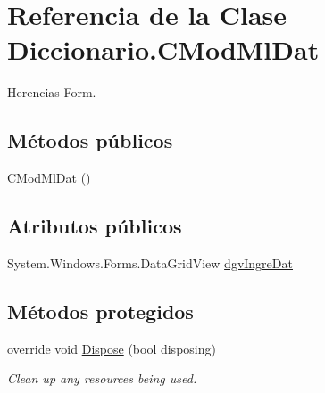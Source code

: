 \hypertarget{class_diccionario_1_1_c_mod_ml_dat}{\section{Referencia de la Clase Diccionario.\-C\-Mod\-Ml\-Dat}
\label{class_diccionario_1_1_c_mod_ml_dat}
}


Herencias Form.

\subsection*{Métodos públicos}
\begin{DoxyCompactItemize}
\item 
\hyperlink{class_diccionario_1_1_c_mod_ml_dat_afca8701e7d443cd844b384e8e1c8c4fa}{C\-Mod\-Ml\-Dat} ()
\end{DoxyCompactItemize}
\subsection*{Atributos públicos}
\begin{DoxyCompactItemize}
\item 
System.\-Windows.\-Forms.\-Data\-Grid\-View \hyperlink{class_diccionario_1_1_c_mod_ml_dat_a48a368fe6ac56eab43e5e2de5c8e2bd7}{dgv\-Ingre\-Dat}
\end{DoxyCompactItemize}
\subsection*{Métodos protegidos}
\begin{DoxyCompactItemize}
\item 
override void \hyperlink{class_diccionario_1_1_c_mod_ml_dat_a736cc6f211aaa007d74879e44ad07e33}{Dispose} (bool disposing)
\begin{DoxyCompactList}\small\item\em Clean up any resources being used. \end{DoxyCompactList}\end{DoxyCompactItemize}
